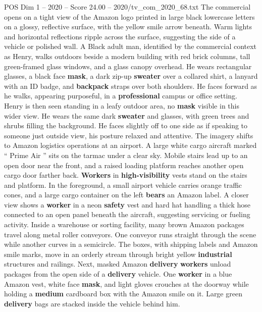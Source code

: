 \begin{textsample}{POS Dim 1 – 2020 – Score 24.00 – 2020/tv\_com\_2020\_68.txt}  \label{ex:f1_pos_003}
The commercial opens on a tight view of the Amazon logo printed in large black lowercase letters on a glossy, reflective surface, with the yellow smile arrow beneath.
Warm lights and horizontal reflections ripple across the surface, suggesting the side of a vehicle or polished wall.
A Black adult man, identified by the commercial context as Henry, walks outdoors beside a modern building with red brick columns, tall green-framed glass windows, and a glass canopy overhead.
He wears rectangular glasses, a black face \textbf{mask}, a dark zip-up \textbf{sweater} over a collared shirt, a lanyard with an ID badge, and \textbf{backpack} straps over both shoulders.
He faces forward as he walks, appearing purposeful, in a \textbf{professional} campus or office setting.
Henry is then seen standing in a leafy outdoor area, no \textbf{mask} visible in this wider view.
He wears the same dark \textbf{sweater} and glasses, with green trees and shrubs filling the background.
He faces slightly off to one side as if speaking to someone just outside view, his posture relaxed and attentive.
The imagery shifts to Amazon logistics operations at an airport.
A large white cargo aircraft marked “ Prime Air ” sits on the tarmac under a clear sky.
Mobile stairs lead up to an open door near the front, and a raised loading platform reaches another open cargo door farther back. \textbf{Workers} in \textbf{high-visibility} vests stand on the stairs and platform.
In the foreground, a small airport vehicle carries orange traffic cones, and a large cargo container on the left \textbf{bears} an Amazon label.
A closer view shows a \textbf{worker} in a neon \textbf{safety} vest and hard hat handling a thick hose connected to an open panel beneath the aircraft, suggesting servicing or fueling activity.
Inside a warehouse or sorting facility, many brown Amazon packages travel along metal roller conveyors.
One conveyor runs straight through the scene while another curves in a semicircle.
The boxes, with shipping labels and Amazon smile marks, move in an orderly stream through bright yellow \textbf{industrial} structures and railings.
Next, masked Amazon \textbf{delivery} \textbf{workers} unload packages from the open side of a \textbf{delivery} vehicle.
One \textbf{worker} in a blue Amazon vest, white face \textbf{mask}, and light gloves crouches at the doorway while holding a \textbf{medium} cardboard box with the Amazon smile on it.
Large green \textbf{delivery} bags are stacked inside the vehicle behind him.

\end{textsample}
